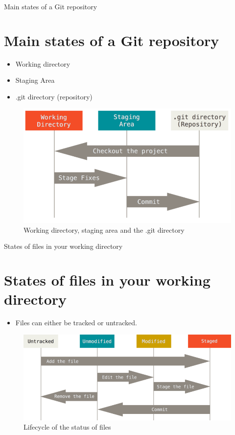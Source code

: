 \documentclass{beamer}
\begin{document}
\begin{frame}{Main states of a Git repository}
\section{Main states of a Git repository}
  \begin{itemize}
  \item {
    Working directory
  }
  \item {   
    Staging Area
  }
  \item {   
    .git directory (repository)
  }
  \end{itemize}
	\begin{figure}
		\includegraphics[scale=0.3]{images/areas}
		\caption{Working directory, staging area and the .git directory\cite{git-basics}}
	\end{figure}
\end{frame}

\begin{frame}{States of files in your working directory}
\section{States of files in your working directory}
	\begin{itemize}
		\item Files can either be tracked or untracked.
	\end{itemize}
	
	\begin{figure}
		\includegraphics[scale=0.4]{images/lifecycle}
		\caption{Lifecycle of the status of files\cite{recording-changes-git}}
	\end{figure}
\end{frame}	
\end{document}
